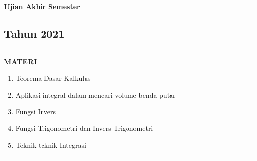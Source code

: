 \begin{flushright}
    \textbf{\Large{Ujian Akhir Semester}}
    \subsection*{Tahun 2021}
\end{flushright}


\vspace{0.5cm}\hrule height 2pt\vspace{0.5cm}


\begin{center}
\textbf{\large{MATERI}}
\begin{enumerate}[leftmargin=*, label={\arabic*}.]
\item Teorema Dasar Kalkulus
\item Aplikasi integral dalam mencari volume benda putar
\item Fungsi Invers
\item Fungsi Trigonometri dan Invers Trigonometri
\item Teknik-teknik Integrasi
\end{enumerate}
\end{center}


\vspace{0.2cm}\hrule height 1pt\vspace{0.5cm}


